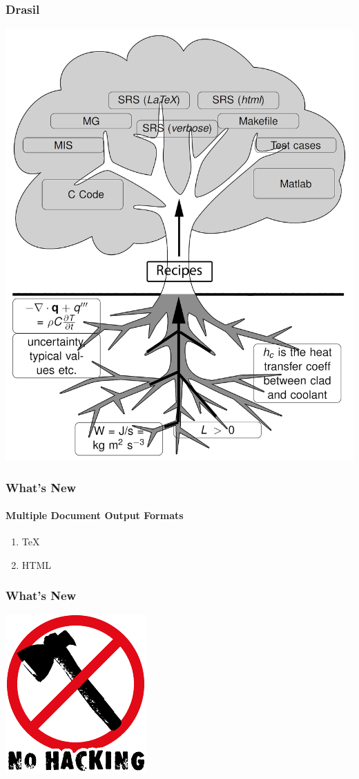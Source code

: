 \documentclass{beamer}
\begin{document}
\begin{frame}

\frametitle{Drasil}
\begin{center}
\includegraphics[width=.65\textwidth]{tree.png}
\end{center}

\end{frame}


\begin{frame}

\frametitle{What's New}

\framesubtitle{Multiple Document Output Formats}

\begin{enumerate}
\item TeX
\item HTML
\end{enumerate}

\end{frame}


\begin{frame}

\frametitle{What's New}

\begin{center}
\includegraphics{no_hacking.png}
\end{center}

\end{frame}
\end{document}
